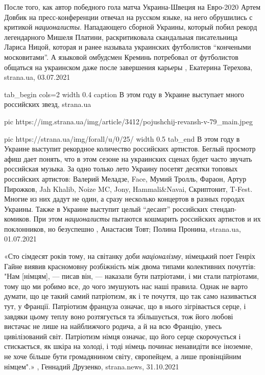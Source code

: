 После того, как автор победного гола матча Украина-Швеция на Евро-2020 Артем
Довбик на пресс-конференции отвечал на русском языке, на него обрушились с
критикой \emph{националисты}.  Нападающего сборной Украины, который побил
рекорд легендарного Мишеля Платини, раскритиковала скандальная писательница
Лариса Ницой, которая и ранее называла украинских футболистов
\enquote{кончеными московитами}. А языковой омбудсмен Креминь потребовал от
футболистов общаться на украинском даже после завершения карьеры
, 
Екатерина Терехова, strana.ua, 03.07.2021

\ifcmt
tab_begin cols=2
  width 0.4
  caption В этом году в Украине выступает много российских звезд, strana.ua

  pic https://img.strana.ua/img/article/3412/pojushchij-revansh-v-79_main.jpeg

  pic https://strana.ua/img/forall/u/0/25/%
  width 0.5
tab_end
\fi
В этом году в Украине выступит рекордное количество российских артистов.
Беглый просмотр афиш дает понять, что в этом сезоне на украинских сценах будет
часто звучать российская музыка. За одно только лето Украину посетят десятки
топовых российских артистов: Валерий Меладзе, Face, Мумий Тролль, Фараон, Артур
Пирожков, Jah Khalib, Noize MC, Jony, Hammali\&Navai, Скриптонит, T-Fest.
Многие из них дадут не один, а сразу несколько концертов в разных городах
Украины.  Также в Украине выступит целый \enquote{десант} российских стендап-комиков.
При этом \emph{националисты} пытаются кошмарить российских артистов и их поклонников,
но безуспешно
, 
Анастасия Товт; Полина Пронина, strana.ua, 01.07.2021

«Сто сімдесят років тому, на світанку доби \emph{націоналізму}, німецький поет Генріх
Гайне виявив красномовну розбіжність між двома типами колективних почуттів:
"Нам [німцям], — писав він, — наказали бути патріотами, і ми стали патріотами,
тому що ми робимо все, до чого змушують нас наші правила. Однак не варто
думати, що це такий самий патріотизм, як і те почуття, що так само називається
тут, у Франції.  Патріотизм француза означає, що в нього зігрівається серце, і
завдяки цьому теплу воно розтягується та збільшується, тож його любові вистачає
не лише на найближчого родича, а й на всю Францію, увесь цивілізований світ.
Патріотизм німця означає, що його серце скорочується і стискається, як шкіра на
холоді, і тоді німець починає ненавидіти все іноземне, не хоче більше бути
громадянином світу, європейцем, а лише провінційним німцем".»
, 
Геннадий Друзенко, strana.news, 31.10.2021

